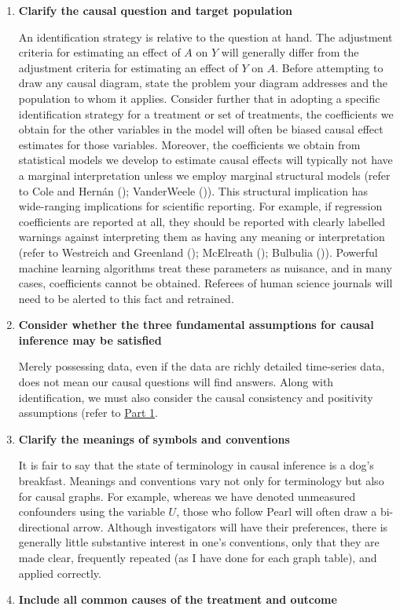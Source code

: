 \documentclass[
  single column]{article}
\begin{document}
\begin{enumerate}
\def\labelenumi{\arabic{enumi}.}
\item
  \textbf{Clarify the causal question and target population}

  An identification strategy is relative to the question at hand. The
  adjustment criteria for estimating an effect of \(A\) on \(Y\) will
  generally differ from the adjustment criteria for estimating an effect
  of \(Y\) on \(A\). Before attempting to draw any causal diagram, state
  the problem your diagram addresses and the population to whom it
  applies. Consider further that in adopting a specific identification
  strategy for a treatment or set of treatments, the coefficients we
  obtain for the other variables in the model will often be biased
  causal effect estimates for those variables. Moreover, the
  coefficients we obtain from statistical models we develop to estimate
  causal effects will typically not have a marginal interpretation
  unless we employ marginal structural models (refer to Cole and Hernán
  (); VanderWeele
  ()). This structural implication
  has wide-ranging implications for scientific reporting. For example,
  if regression coefficients are reported at all, they should be
  reported with clearly labelled warnings against interpreting them as
  having any meaning or interpretation (refer to Westreich and Greenland
  (); McElreath
  (); Bulbulia
  ()). Powerful machine learning
  algorithms treat these parameters as nuisance, and in many cases,
  coefficients cannot be obtained. Referees of human science journals
  will need to be alerted to this fact and retrained.
\item
  \textbf{Consider whether the three fundamental assumptions for causal
  inference may be satisfied}

  Merely possessing data, even if the data are richly detailed
  time-series data, does not mean our causal questions will find
  answers. Along with identification, we must also consider the causal
  consistency and positivity assumptions (refer to
  \hyperref[id-sec-1]{Part 1}.
\item
  \textbf{Clarify the meanings of symbols and conventions}

  It is fair to say that the state of terminology in causal inference is
  a dog's breakfast. Meanings and conventions vary not only for
  terminology but also for causal graphs. For example, whereas we have
  denoted unmeasured confounders using the variable \(U\), those who
  follow Pearl will often draw a bi-directional arrow. Although
  investigators will have their preferences, there is generally little
  substantive interest in one's conventions, only that they are made
  clear, frequently repeated (as I have done for each graph table), and
  applied correctly.
\item
  \textbf{Include all common causes of the treatment and outcome}


\end{enumerate}
\end{document}
